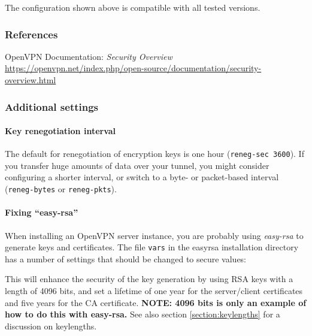 The configuration shown above is compatible with all tested versions.


\subsubsection{References}
\begin{itemize*}
  \item OpenVPN Documentation: \emph{Security Overview} \url{https://openvpn.net/index.php/open-source/documentation/security-overview.html}
\end{itemize*}



\subsubsection{Additional settings}

\paragraph{Key renegotiation interval}
The default for renegotiation of encryption keys is one hour
(\verb|reneg-sec 3600|). If you
transfer huge amounts of data over your tunnel, you might consider
configuring a shorter interval, or switch to a byte- or packet-based
interval (\verb|reneg-bytes| or \verb|reneg-pkts|).

\paragraph{Fixing ``easy-rsa''}
When installing an OpenVPN server instance, you are probably using
\emph{easy-rsa} to generate keys and certificates.
The file \verb|vars| in the easyrsa installation directory has a
number of settings that should be changed to secure values:



This will enhance the security of the key generation by using RSA keys
with a length of 4096 bits, and set a lifetime of one year for the
server/client certificates and five years for the CA certificate. \textbf{NOTE: 4096 bits is only an example of how to do this with easy-rsa.} See also section \ref{section:keylengths} for a discussion on keylengths.

